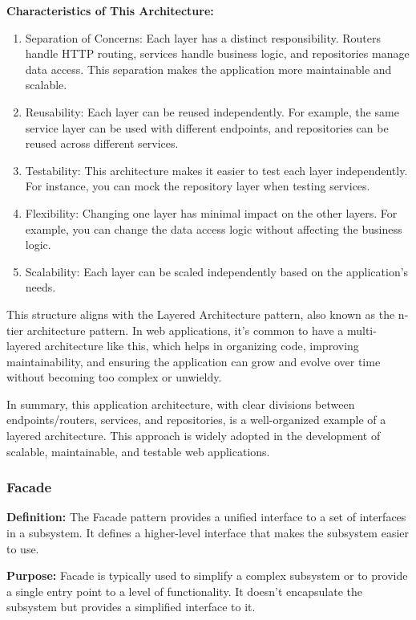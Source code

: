 \textbf{Characteristics of This Architecture:}
\begin{enumerate}
\item Separation of Concerns: Each layer has a distinct responsibility. Routers handle HTTP routing, services handle business logic, and repositories manage data access. This separation makes the application more maintainable and scalable.

\item Reusability: Each layer can be reused independently. For example, the same service layer can be used with different endpoints, and repositories can be reused across different services.

\item Testability: This architecture makes it easier to test each layer independently. For instance, you can mock the repository layer when testing services.

\item Flexibility: Changing one layer has minimal impact on the other layers. For example, you can change the data access logic without affecting the business logic.

\item Scalability: Each layer can be scaled independently based on the application's needs.
\end{enumerate}

This structure aligns with the Layered Architecture pattern, also known as the n-tier architecture pattern. In web applications, it's common to have a multi-layered architecture like this, which helps in organizing code, improving maintainability, and ensuring the application can grow and evolve over time without becoming too complex or unwieldy.

In summary, this application architecture, with clear divisions between endpoints/routers, services, and repositories, is a well-organized example of a layered architecture. This approach is widely adopted in the development of scalable, maintainable, and testable web applications.

\subsubsection{Facade}
\textbf{Definition:} The Facade pattern provides a unified interface to a set of interfaces in a subsystem. It defines a higher-level interface that makes the subsystem easier to use.

\textbf{Purpose:} Facade is typically used to simplify a complex subsystem or to provide a single entry point to a level of functionality. It doesn't encapsulate the subsystem but provides a simplified interface to it.

